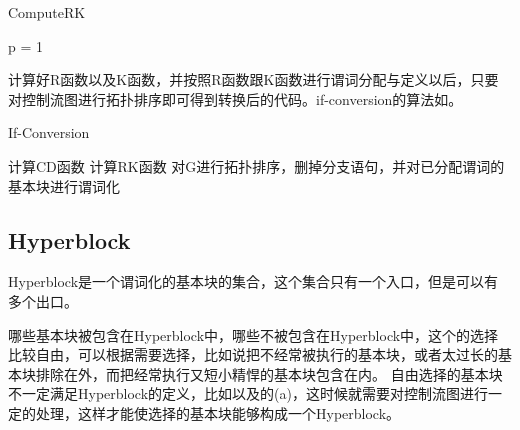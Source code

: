 \begin{algorithm}[H]
	\label{alg:ComputeRK}
	\caption{ComputeRK}
	p = 1
\end{algorithm}
计算好R函数以及K函数，并按照R函数跟K函数进行谓词分配与定义以后，只要对控制流图进行拓扑排序即可得到转换后的代码。if-conversion的算法如。

\begin{algorithm}[H]
	\label{alg:ifcvt}
	\caption{If-Conversion}
	计算CD函数\;
	计算RK函数\;
	对G进行拓扑排序，删掉分支语句，并对已分配谓词的基本块进行谓词化\;
\end{algorithm}


\subsection{Hyperblock}

\begin{definition}[Hyperblock]
Hyperblock是一个谓词化的基本块的集合，这个集合只有一个入口，但是可以有多个出口。
\end{definition}

哪些基本块被包含在Hyperblock中，哪些不被包含在Hyperblock中，这个的选择比较自由，可以根据需要选择，比如说把不经常被执行的基本块，或者太过长的基本块排除在外，而把经常执行又短小精悍的基本块包含在内。
自由选择的基本块不一定满足Hyperblock的定义，比如以及的(a)，这时候就需要对控制流图进行一定的处理，这样才能使选择的基本块能够构成一个Hyperblock。

